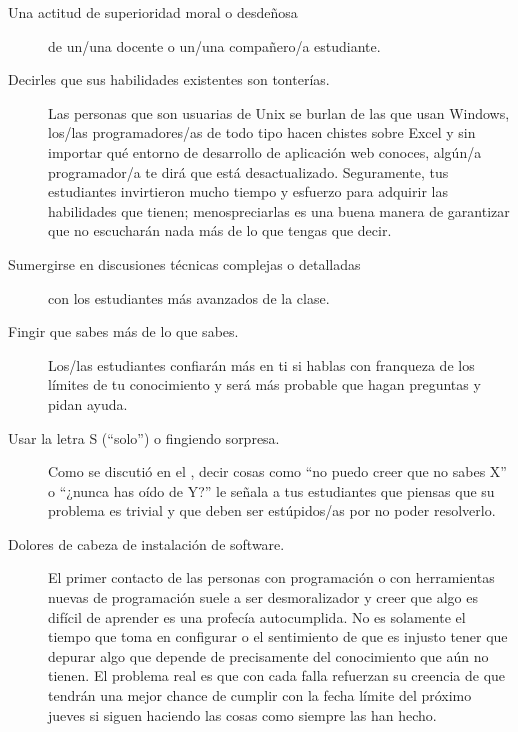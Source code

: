 \begin{description}

\item[Una actitud de superioridad moral o desdeñosa]
  de un/una docente o un/una compañero/a estudiante.

\item[Decirles que sus habilidades existentes son tonterías.]
  Las personas que son usuarias de Unix se burlan de las que usan Windows,
  los/las programadores/as de todo tipo hacen chistes sobre Excel
  y sin importar qué entorno de desarrollo de aplicación web conoces,
  algún/a programador/a te dirá que está desactualizado.
  Seguramente, tus estudiantes invirtieron mucho tiempo y esfuerzo para adquirir las habilidades que tienen;
  menospreciarlas es una buena manera de garantizar que
  no escucharán nada más de lo que tengas que decir.

\item[Sumergirse en discusiones técnicas complejas o detalladas]
  con los estudiantes más avanzados de la clase.

\item[Fingir que sabes más de lo que sabes.]
  Los/las estudiantes confiarán más en ti si hablas con franqueza de los límites de tu conocimiento
  y será más probable que hagan preguntas y pidan ayuda.

\item[Usar la letra S (``solo'') o fingiendo sorpresa.]
  Como se discutió en el ,
  decir cosas como ``no puedo creer que no sabes X'' o ``¿nunca has oído de Y?''
  le señala a tus estudiantes que
  piensas que su problema es trivial
  y que deben ser estúpidos/as por no poder resolverlo.

\item[Dolores de cabeza de instalación de software.]
  El primer contacto de las personas con programación o con herramientas nuevas de programación suele a ser desmoralizador
  y creer que algo es difícil de aprender es una profecía autocumplida.
  No es solamente el tiempo que toma en configurar
  o el sentimiento de que es injusto tener que depurar algo que depende de
  precisamente del conocimiento que aún no tienen.
    El problema real es que con cada falla refuerzan su creencia de que
  tendrán una mejor chance de cumplir con la fecha límite del próximo jueves
  si siguen haciendo las cosas como siempre las han hecho.

\end{description}

